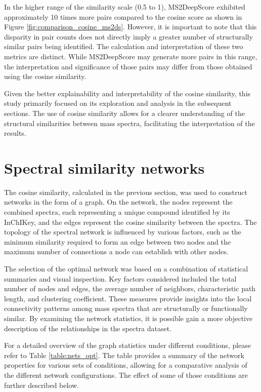 In the higher range of the similarity scale (0.5 to 1), MS2DeepScore exhibited approximately 10 times more pairs compared to the cosine score as shown in Figure \ref{fig:comparison_cosine_ms2ds}. However, it is important to note that this disparity in pair counts does not directly imply a greater number of structurally similar pairs being identified. The calculation and interpretation of these two metrics are distinct. While MS2DeepScore may generate more pairs in this range, the interpretation and significance of those pairs may differ from those obtained using the cosine similarity.

Given the better explainability and interpretability of the cosine similarity, this study primarily focused on its exploration and analysis in the subsequent sections. The use of cosine similarity allows for a clearer understanding of the structural similarities between mass spectra, facilitating the interpretation of the results.

\section*{Spectral similarity networks}
\label{sec:networks}
The cosine similarity, calculated in the previous section, was used to construct networks in the form of a graph. On the network, the nodes represent the combined spectra, each representing a unique compound identified by its InChIKey, and the edges represent the cosine similarity between the spectra. The topology of the spectral network is influenced by various factors, such as the minimum similarity required to form an edge between two nodes and the maximum number of connections a node can establish with other nodes.

The selection of the optimal network was based on a combination of statistical summaries and visual inspection. Key factors considered included the total number of nodes and edges, the average number of neighbors, characteristic path length, and clustering coefficient. These measures provide insights into the local connectivity patterns among mass spectra that are structurally or functionally similar. By examining the network statistics, it is possible gain a more objective description of the relationships in the spectra dataset.

For a detailed overview of the graph statistics under different conditions, please refer to Table \ref{table:nets_opt}. The table provides a summary of the network properties for various sets of conditions, allowing for a comparative analysis of the different network configurations. The effect of some of those conditions are further described below.

